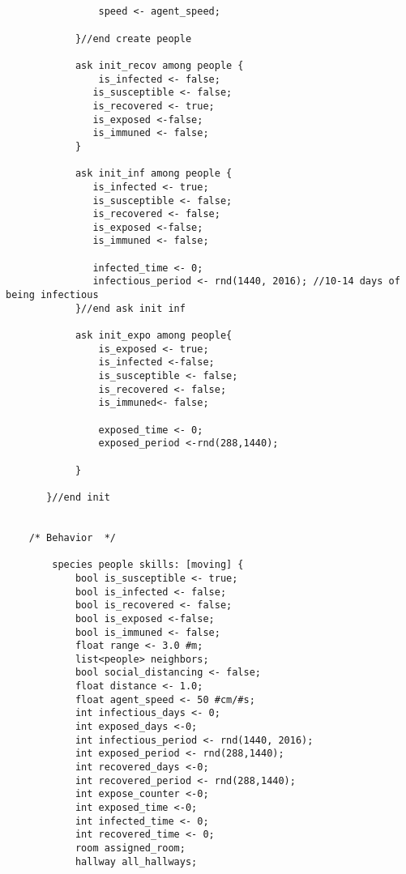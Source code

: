 \begin{lstlisting}
                
                
                speed <- agent_speed;
                
            }//end create people 
            
            ask init_recov among people {
                is_infected <- false;
               is_susceptible <- false;
               is_recovered <- true;
               is_exposed <-false;   
               is_immuned <- false; 
            }
    
            ask init_inf among people {
               is_infected <- true;
               is_susceptible <- false;
               is_recovered <- false;
               is_exposed <-false;   
               is_immuned <- false;  
               
               infected_time <- 0;
               infectious_period <- rnd(1440, 2016); //10-14 days of being infectious
            }//end ask init inf   
            
            ask init_expo among people{
                is_exposed <- true;
                is_infected <-false;
                is_susceptible <- false;
                is_recovered <- false;
                is_immuned<- false;
                
                exposed_time <- 0;
                exposed_period <-rnd(288,1440); 
                
            }
            
       }//end init 
       
    
    /* Behavior  */
    
        species people skills: [moving] {
            bool is_susceptible <- true;
            bool is_infected <- false;
            bool is_recovered <- false;
            bool is_exposed <-false;
            bool is_immuned <- false;
            float range <- 3.0 #m;
            list<people> neighbors;
            bool social_distancing <- false;
            float distance <- 1.0;
            float agent_speed <- 50 #cm/#s;
            int infectious_days <- 0;
            int exposed_days <-0;
            int infectious_period <- rnd(1440, 2016);
            int exposed_period <- rnd(288,1440);
            int recovered_days <-0;
            int recovered_period <- rnd(288,1440);
            int expose_counter <-0;
            int exposed_time <-0;
            int infected_time <- 0;
            int recovered_time <- 0;
            room assigned_room;
            hallway all_hallways;
            

\end{lstlisting}
